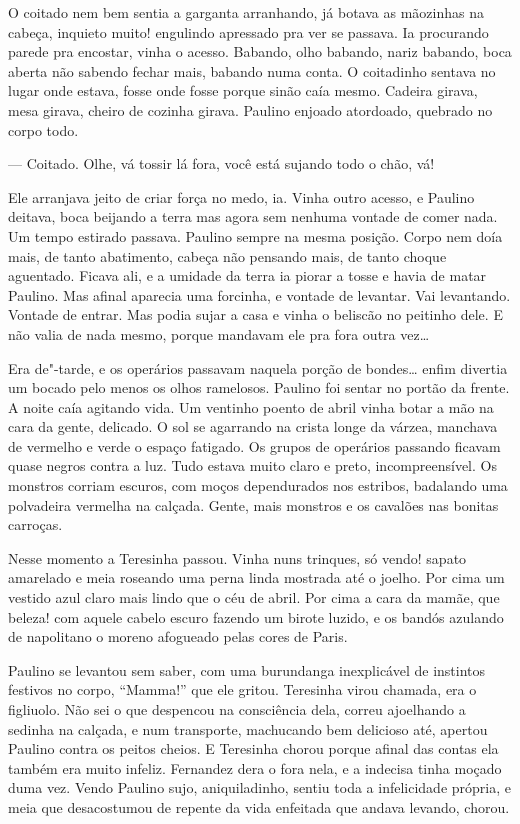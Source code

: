 \begin{linenumbers}
O coitado nem bem sentia a garganta arranhando, já botava as mãozinhas
na cabeça, inquieto muito! engulindo apressado pra ver se passava. Ia
procurando parede pra encostar, vinha o acesso. Babando, olho babando,
nariz babando, boca aberta não sabendo fechar mais, babando numa conta.
O coitadinho sentava no lugar onde estava, fosse onde fosse porque sinão
caía mesmo. Cadeira girava, mesa girava, cheiro de cozinha girava.
Paulino enjoado atordoado, quebrado no corpo todo.

--- Coitado. Olhe, vá tossir lá fora, você está sujando todo o chão, vá!

Ele arranjava jeito de criar força no medo, ia. Vinha outro acesso, e
Paulino deitava, boca beijando a terra mas agora sem nenhuma vontade de
comer nada. Um tempo estirado passava. Paulino sempre na mesma posição.
Corpo nem doía mais, de tanto abatimento, cabeça não pensando mais, de
tanto choque aguentado. Ficava ali, e a umidade da terra ia piorar a
tosse e havia de matar Paulino. Mas afinal aparecia uma forcinha, e
vontade de levantar. Vai levantando. Vontade de entrar. Mas podia sujar
a casa e vinha o beliscão no peitinho dele. E não valia de nada mesmo,
porque mandavam ele pra fora outra vez\ldots{} 

Era de"-tarde, e os operários passavam naquela porção de bondes\ldots{} enfim
divertia um bocado pelo menos os olhos ramelosos. Paulino foi sentar no
portão da frente. A noite caía agitando vida. Um ventinho poento de
abril vinha botar a mão na cara da gente, delicado. O sol se agarrando
na crista longe da várzea, manchava de vermelho e verde o espaço
fatigado. Os grupos de operários passando ficavam quase negros contra a
luz. Tudo estava muito claro e preto, incompreensível. Os monstros
corriam escuros, com moços dependurados nos estribos, badalando uma
polvadeira vermelha na calçada. Gente, mais monstros e os cavalões nas
bonitas carroças.

Nesse momento a Teresinha passou. Vinha nuns trinques, só vendo! sapato
amarelado e meia roseando uma perna linda mostrada até o joelho. Por
cima um vestido azul claro mais lindo que o céu de abril. Por cima a
cara da mamãe, que beleza! com aquele cabelo escuro fazendo um birote
luzido, e os bandós azulando de napolitano o moreno afogueado pelas
cores de Paris.

Paulino se levantou sem saber, com uma burundanga inexplicável de
instintos festivos no corpo, ``Mamma!'' que ele gritou. Teresinha virou
chamada, era o figliuolo. Não sei o que despencou na consciência dela,
correu ajoelhando a sedinha na calçada, e num transporte, machucando bem
delicioso até, apertou Paulino contra os peitos cheios. E Teresinha
chorou porque afinal das contas ela também era muito infeliz. Fernandez
dera o fora nela, e a indecisa tinha moçado duma vez. Vendo Paulino
sujo, aniquiladinho, sentiu toda a infelicidade própria, e meia que
desacostumou de repente da vida enfeitada que andava levando, chorou.


\end{linenumbers}
